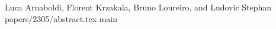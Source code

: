 \paperchapter%
  {}%
  {Luca Arnaboldi, Florent Krzakala, Bruno Loureiro, and Ludovic Stephan}%
  {papers/2305/abstract.tex}
\label{chap:paper-2305}
{\let\appendix\endinput {main}}
